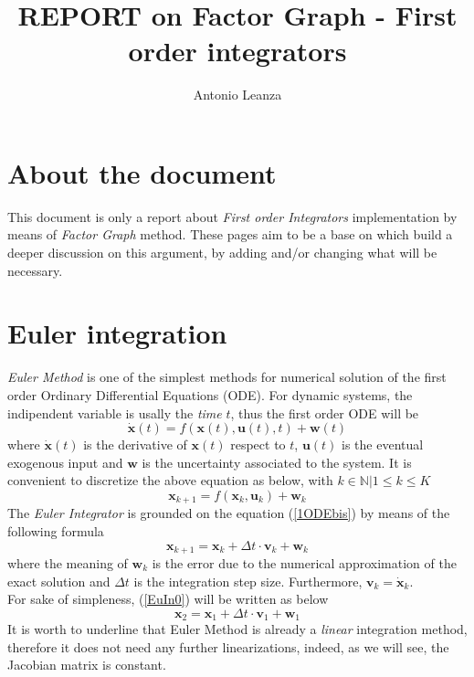\documentclass[12pt,a4paper]{book}
\author{Antonio Leanza}
\title{REPORT on Factor Graph - First order integrators}
\begin{document}
\maketitle

\section*{About the document}
This document is only a report about \textit{First order Integrators} implementation by means of \textit{Factor Graph} method. These pages aim to be a base on which build a deeper discussion on this argument, by adding and/or changing what will be necessary.

\section*{Euler integration}
\textit{Euler Method} is one of the simplest methods for numerical solution of the first order Ordinary Differential Equations (ODE). For dynamic systems, the indipendent variable is usally the \textit{time} $t$, thus the first order ODE will be
\begin{equation}
\dot{\mathbf{x}}(t)=f\left(\mathbf{x}(t),\mathbf{u}(t),t\right)+\mathbf{w}(t)
\label{1ODE}
\end{equation}
where $\dot{\mathbf{x}}(t)$ is the derivative of $\mathbf{x}(t)$ respect to $t$, $\mathbf{u}(t)$ is the eventual exogenous input and $\mathbf{w}$ is the uncertainty associated to the system. It is convenient to discretize the above equation as below, with $k \in \mathbb{N}|1 \le k \le K$
\begin{equation}
\mathbf{x}_{k+1}=f\left(\mathbf{x}_k,\mathbf{u}_k\right)+\mathbf{w}_k
\label{1ODEbis}
\end{equation}
The \textit{Euler Integrator} is grounded on the equation (\ref{1ODEbis}) by means of the following formula
\begin{equation}
\mathbf{x}_{k+1}=\mathbf{x}_k+\Delta t\cdot \mathbf{v}_k+\mathbf{w}_k
\label{EuIn0}
\end{equation}
where the meaning of $\mathbf{w}_k$ is the error due to the numerical approximation of the exact solution and $\Delta t$ is the integration step size. Furthermore, $\mathbf{v}_k=\dot{\mathbf{x}}_k$.
\\For sake of simpleness, (\ref{EuIn0}) will be written as below
 \begin{equation}
\mathbf{x}_2=\mathbf{x}_1+\Delta t\cdot \mathbf{v}_1+\mathbf{w}_1
\label{EuIn1}
\end{equation}
It is worth to underline that Euler Method is already a \textit{linear} integration method, therefore it does not need any further linearizations, indeed, as we will see, the Jacobian matrix is constant.
\end{document}
